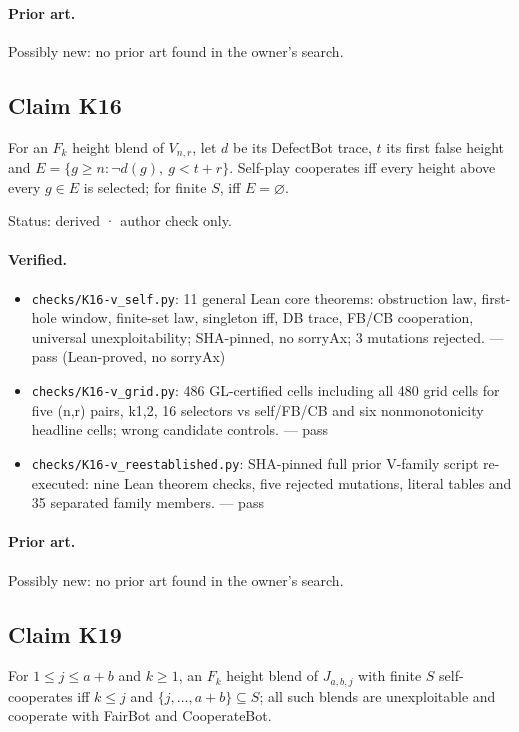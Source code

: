 \documentclass{article}
\begin{document}
\paragraph{Prior art.} Possibly new: no prior art found in the owner's search.

\subsection*{Claim K16}

For an $F_k$ height blend of $V_{n,r}$, let $d$ be its DefectBot trace, $t$ its first false height and $E=\{g\ge n:\neg d(g),\ g<t+r\}$. Self-play cooperates iff every height above every $g\in E$ is selected; for finite $S$, iff $E=\varnothing$.

Status: derived · author check only.

\paragraph{Verified.}
\begin{itemize}
\item \texttt{checks/K16-v\_self.py}: 11 general Lean core theorems: obstruction law, first-hole window, finite-set law, singleton iff, DB trace, FB/CB cooperation, universal unexploitability; SHA-pinned, no sorryAx; 3 mutations rejected. --- pass (Lean-proved, no sorryAx)
\item \texttt{checks/K16-v\_grid.py}: 486 GL-certified cells including all 480 grid cells for five (n,r) pairs, k1,2, 16 selectors vs self/FB/CB and six nonmonotonicity headline cells; wrong candidate controls. --- pass
\item \texttt{checks/K16-v\_reestablished.py}: SHA-pinned full prior V-family script re-executed: nine Lean theorem checks, five rejected mutations, literal tables and 35 separated family members. --- pass
\end{itemize}

\paragraph{Prior art.} Possibly new: no prior art found in the owner's search.

\subsection*{Claim K19}

For $1\le j\le a+b$ and $k\ge1$, an $F_k$ height blend of $J_{a,b,j}$ with finite $S$ self-cooperates iff $k\le j$ and $\{j,\ldots,a+b\}\subseteq S$; all such blends are unexploitable and cooperate with FairBot and CooperateBot.
\end{document}

